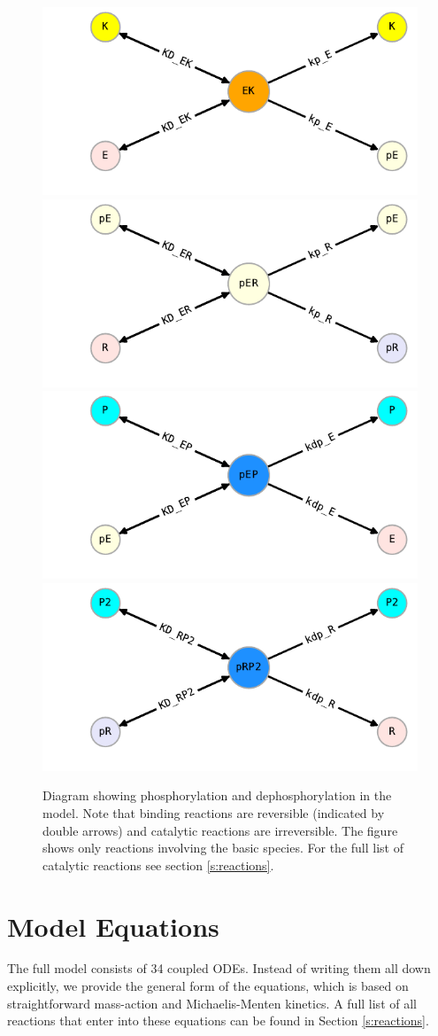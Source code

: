 \documentclass[12pt]{article}
\begin{document}
	\begin{figure}[h!]
		\centering \includegraphics[width=0.45\linewidth]{../res/diagram_EK}
		\includegraphics[width=0.45\linewidth]{../res/diagram_pER}\\
		\includegraphics[width=0.45\linewidth]{../res/diagram_EP}
		\includegraphics[width=0.45\linewidth]{../res/diagram_RP2}
		\caption{Diagram showing phosphorylation and dephosphorylation in the model.
			Note that binding reactions are reversible (indicated
			by double arrows) and catalytic reactions are irreversible. The figure shows only reactions involving the basic species. For the full list of catalytic reactions see section \ref{s:reactions}.}
		\label{fig:catalytic} 
	\end{figure}
	
	
	\section{Model Equations}
	The full model consists of 34 coupled ODEs. Instead of writing them
	all down explicitly, we provide the general
	form of the equations, which is based on straightforward mass-action
	and Michaelis-Menten kinetics. A full list of all reactions that enter into these equations can be found in Section \ref{s:reactions}.
	
\end{document}
